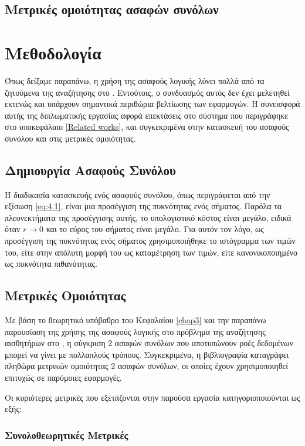 \subsection{Μετρικές ομοιότητας ασαφών συνόλων}

\section{Μεθοδολογία}
Όπως δείξαμε παραπάνω, η χρήση της ασαφούς λογικής λύνει πολλά από τα ζητούμενα της αναζήτησης στο .
Εντούτοις, ο συνδυασμός αυτός δεν έχει μελετηθεί εκτενώς και υπάρχουν σημαντικά περιθώρια βελτίωσης των εφαρμογών.
Η συνεισφορά αυτής της διπλωματικής εργασίας αφορά επεκτάσεις στο σύστημα που περιγράφηκε στο υποκεφάλαιο \ref{Related works}, και συγκεκριμένα στην κατασκευή του ασαφούς συνόλου και στις μετρικές ομοιότητας.

\subsection{Δημιουργία Ασαφούς Συνόλου}

Η διαδικασία κατασκευής ενός ασαφούς συνόλου, όπως περιγράφεται από την εξίσωση \ref{eq:4.1}, είναι μια προσέγγιση της πυκνότητας ενός σήματος.
Παρόλα τα πλεονεκτήματα της προσέγγισης αυτής, το υπολογιστικό κόστος είναι μεγάλο, ειδικά όταν \(r \rightarrow 0\) και το εύρος του σήματος είναι μεγάλο.
Για αυτόν τον λόγο, ως προσέγγιση της πυκνότητας ενός σήματος χρησιμοποιήθηκε το ιστόγραμμα των τιμών του, είτε στην απόλυτη μορφή του ως καταμέτρηση των τιμών, είτε κανονικοποιημένο ως πυκνότητα πιθανότητας. 

\subsection{Μετρικές Ομοιότητας}
Με βάση το θεωρητικό υπόβαθρο του Κεφαλαίου \ref{chap3} και την παραπάνω παρουσίαση της χρήσης της ασαφούς λογικής στο πρόβλημα της αναζήτησης αισθητήρων στο , η σύγκριση 2 ασαφών συνόλων που αποτυπώνουν ροές δεδομένων μπορεί να γίνει με πολλαπλούς τρόπους.
Συγκεκριμένα, η βιβλιογραφία καταγράφει πληθώρα μετρικών ομοιότητας 2 ασαφών συνόλων, οι οποίες έχουν χρησιμοποιηθεί επιτυχώς σε παρόμοιες εφαρμογές.
\par
Οι κυριότερες μετρικές που εξετάζονται στην παρούσα εργασία κατηγοριοποιούνται ως εξής:

\subsubsection{Συνολοθεωρητικές Μετρικές}

